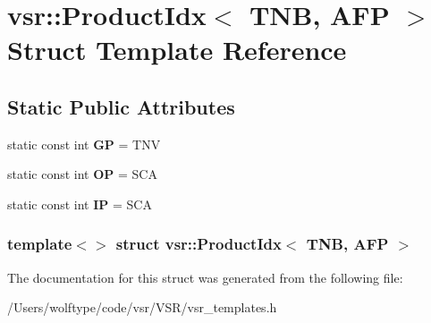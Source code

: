 \hypertarget{structvsr_1_1_product_idx_3_01_t_n_b_00_01_a_f_p_01_4}{\section{vsr\-:\-:Product\-Idx$<$ T\-N\-B, A\-F\-P $>$ Struct Template Reference}
\label{structvsr_1_1_product_idx_3_01_t_n_b_00_01_a_f_p_01_4}
}
\subsection*{Static Public Attributes}
\begin{DoxyCompactItemize}
\item 
\hypertarget{structvsr_1_1_product_idx_3_01_t_n_b_00_01_a_f_p_01_4_a324c6fbb01a068d3bc6fe1db38dbd765}{static const int {\bfseries G\-P} = T\-N\-V}\label{structvsr_1_1_product_idx_3_01_t_n_b_00_01_a_f_p_01_4_a324c6fbb01a068d3bc6fe1db38dbd765}

\item 
\hypertarget{structvsr_1_1_product_idx_3_01_t_n_b_00_01_a_f_p_01_4_ab834e5030b57ec47107c56742f6a9415}{static const int {\bfseries O\-P} = S\-C\-A}\label{structvsr_1_1_product_idx_3_01_t_n_b_00_01_a_f_p_01_4_ab834e5030b57ec47107c56742f6a9415}

\item 
\hypertarget{structvsr_1_1_product_idx_3_01_t_n_b_00_01_a_f_p_01_4_afb71b2bed9efbc296ebd99ad80e70d72}{static const int {\bfseries I\-P} = S\-C\-A}\label{structvsr_1_1_product_idx_3_01_t_n_b_00_01_a_f_p_01_4_afb71b2bed9efbc296ebd99ad80e70d72}

\end{DoxyCompactItemize}
\subsubsection*{template$<$$>$ struct vsr\-::\-Product\-Idx$<$ T\-N\-B, A\-F\-P $>$}



The documentation for this struct was generated from the following file\-:\begin{DoxyCompactItemize}
\item 
/\-Users/wolftype/code/vsr/\-V\-S\-R/vsr\-\_\-templates.\-h\end{DoxyCompactItemize}
